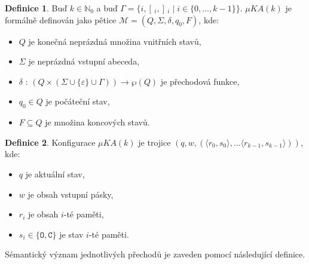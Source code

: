 \documentclass[thesis=B,czech]{FITthesis}[2019/12/23]
\theoremstyle{definition}
\newtheorem{definition}{Definice}[chapter]
\begin{document}
\begin{definition}
Buď $k \in \mathbb{N}_0$ a buď $\Gamma = \{i, [\,_i, ]\,_i \mid i \in \{0,\dots, k-1\}\}$.
$\mu KA(k)$ je formálně definován jako pětice $\mathcal{M} = \left(Q, \Sigma, \delta, q_0, F\right)$, kde:
\begin{itemize}
	\item{$Q$ je konečná neprázdná množina vnitřních stavů,}
	\item{$\Sigma$ je neprázdná vstupní abeceda,}
	\item{$\delta$ : $\left(Q \times (\Sigma \cup \{\varepsilon\} \cup \Gamma)\right) \rightarrow \wp\left( Q \right)$ je přechodová funkce,}
	\item{$q_0 \in Q$ je počáteční stav,}
	\item{$F \subseteq Q$ je množina koncových stavů. \cite{schmidref}}
\end{itemize}
\end{definition}

\begin{definition}
Konfigurace $\mu KA(k)$ je trojice ${(q, w, (\big\langle r_0, s_0\big\rangle, \dots \big\langle r_{k-1}, s_{k-1}\big\rangle))}$, kde:
\begin{itemize}
	\item $q$ je aktuální stav,
	\item $w$ je obsah vstupní pásky,
	\item $r_i$ je obsah $i$-té paměti,
	\item $s_i \in \{\texttt{O}, \texttt{C}\}$ je stav $i$-té paměti. \cite{schmidref}
\end{itemize}
\end{definition}

Sémantický význam jednotlivých přechodů je zaveden pomocí následující definice.
\end{document}
